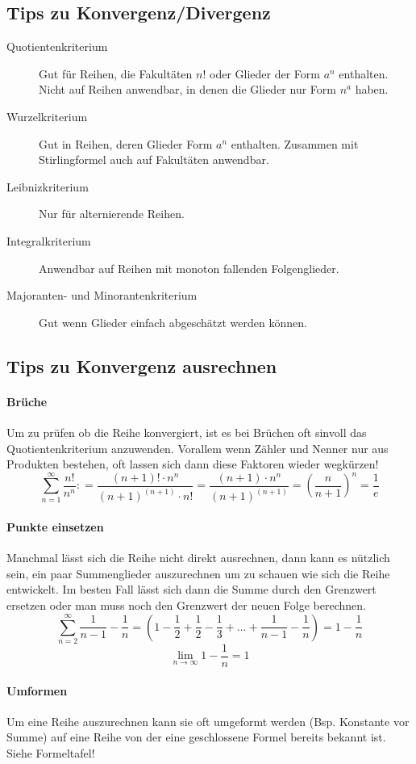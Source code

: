 \subsection{Tips zu Konvergenz/Divergenz}
\vspace{-0.2cm}
\begin{description}
	\item [Quotientenkriterium] Gut für Reihen, die Fakultäten $n!$ oder Glieder der Form $a^n$ enthalten. Nicht auf Reihen anwendbar, in denen die Glieder nur Form $n^a$ haben.

	\item [Wurzelkriterium] Gut in Reihen, deren Glieder Form $a^n$ enthalten. Zusammen mit Stirlingformel auch auf Fakultäten anwendbar.

	\item [Leibnizkriterium] Nur für alternierende Reihen.

	\item [Integralkriterium] Anwendbar auf Reihen mit monoton fallenden Folgenglieder.

	\item [Majoranten- und Minorantenkriterium] Gut wenn Glieder einfach abgeschätzt werden können.
\end{description}

\subsection{Tips zu Konvergenz ausrechnen}
\paragraph{Brüche}
\vspace{-0.2cm}
Um zu prüfen ob die Reihe konvergiert, ist es bei Brüchen oft sinvoll das Quotientenkriterium anzuwenden. Vorallem wenn Zähler und Nenner nur aus Produkten bestehen, oft lassen sich dann diese Faktoren wieder wegkürzen!
\[
	\sum_{n=1}^\infty \frac{n!}{n^n}: = \frac{(n+1)! \cdot n^n}{(n+1)^{(n+1)} \cdot n!} 
	= \frac{(n+1) \cdot n^n}{(n+1)^{(n+1)}} = \left( \frac{n}{n+1} \right)^n = \frac{1}{e}
\]

\paragraph{Punkte einsetzen}
\vspace{-0.2cm}
Manchmal lässt sich die Reihe nicht direkt ausrechnen, dann kann es nützlich sein, ein paar Summenglieder auszurechnen um zu schauen wie sich die Reihe entwickelt. Im besten Fall lässt sich dann die Summe durch den Grenzwert ersetzen oder man muss noch den Grenzwert der neuen Folge berechnen. 
\[
	\sum_{n=2}^\infty \frac{1}{n-1} - \frac{1}{n} = \left( 1 - \frac{1}{2} + \frac{1}{2} - \frac{1}{3} + \ldots + \frac{1}{n-1} - \frac{1}{n} \right) = 1 - \frac{1}{n}
\]
\[
	\lim_{n \to \infty} 1 - \frac{1}{n} = 1
\]

\paragraph{Umformen}
\vspace{-0.2cm}
Um eine Reihe auszurechnen kann sie oft umgeformt werden (Bsp. Konstante vor Summe) auf eine Reihe von der eine geschlossene Formel bereits bekannt ist. Siehe Formeltafel!
\pagebreak